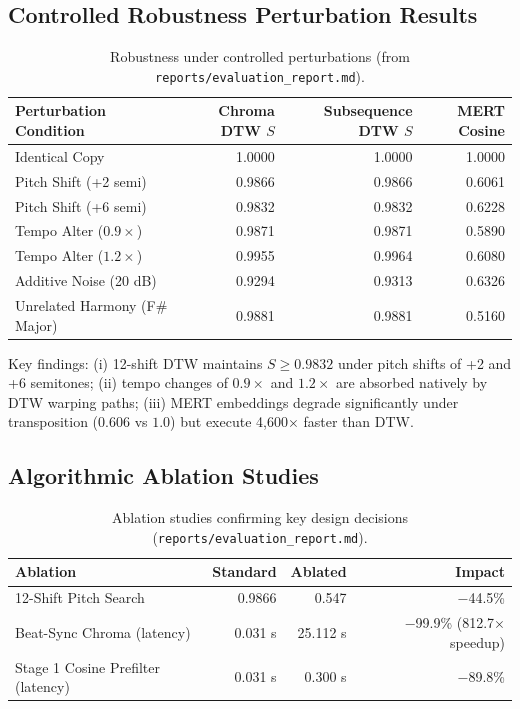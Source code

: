 \documentclass[12pt,a4paper]{article}
\begin{document}
\subsection{Controlled Robustness Perturbation Results}

\renewcommand{\arraystretch}{1.2}
\begin{table}[H]
\centering
\caption{Robustness under controlled perturbations (from \texttt{reports/evaluation\_report.md}).}
\label{tab:robustness}
\begin{tabularx}{\textwidth}{|X|r|r|r|}
\hline
\textbf{Perturbation Condition} & \textbf{Chroma DTW $S$} & \textbf{Subsequence DTW $S$} & \textbf{MERT Cosine} \\
\hline
Identical Copy & 1.0000 & 1.0000 & 1.0000 \\
\hline
Pitch Shift (+2 semi) & 0.9866 & 0.9866 & 0.6061 \\
\hline
Pitch Shift (+6 semi) & 0.9832 & 0.9832 & 0.6228 \\
\hline
Tempo Alter ($0.9\times$) & 0.9871 & 0.9871 & 0.5890 \\
\hline
Tempo Alter ($1.2\times$) & 0.9955 & 0.9964 & 0.6080 \\
\hline
Additive Noise (20 dB) & 0.9294 & 0.9313 & 0.6326 \\
\hline
Unrelated Harmony (F\# Major) & 0.9881 & 0.9881 & 0.5160 \\
\hline
\end{tabularx}
\end{table}

Key findings: (i) 12-shift DTW maintains $S \geq 0.9832$ under pitch shifts
of +2 and +6 semitones; (ii) tempo changes of $0.9\times$ and $1.2\times$ are
absorbed natively by DTW warping paths; (iii) MERT embeddings degrade
significantly under transposition ($0.606$ vs $1.0$) but execute 4,600$\times$
faster than DTW.

\subsection{Algorithmic Ablation Studies}

\renewcommand{\arraystretch}{1.2}
\begin{table}[H]
\centering
\caption{Ablation studies confirming key design decisions (\texttt{reports/evaluation\_report.md}).}
\label{tab:ablation}
\begin{tabularx}{\textwidth}{|X|r|r|r|}
\hline
\textbf{Ablation} & \textbf{Standard} & \textbf{Ablated} & \textbf{Impact} \\
\hline
12-Shift Pitch Search & 0.9866 & 0.547 & $-$44.5\% \\
\hline
Beat-Sync Chroma (latency) & 0.031 s & 25.112 s & $-$99.9\% (812.7$\times$ speedup) \\
\hline
Stage 1 Cosine Prefilter (latency) & 0.031 s & 0.300 s & $-$89.8\% \\
\hline
\end{tabularx}
\end{table}
\end{document}

